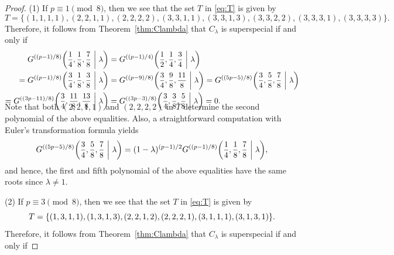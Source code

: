 \documentclass[10pt,a4paper]{amsart}
\begin{document}
\begin{proof}
(1) If $p \equiv 1 \pmod{8}$, then we see that the set $T$ in \eqref{eq:T} is given by\vspace{-1mm}
\[
    T = \{(1,1,1,1),(2,2,1,1),(2,2,2,2),(3,3,1,1),(3,3,1,3),(3,3,2,2),(3,3,3,1),(3,3,3,3)\}.
\]
Therefore, it follows from Theorem~\ref{thm:Clambda} that $C_\lambda$ is superspecial if and only if\vspace{-1.1mm}
\begin{align*}
    G^{((p-1)/8)}\scalebox{0.95}{$\displaystyle\left(\frac{1}{4},\frac{1}{8},\frac{7}{8}\ \middle|\ \lambda\right)$} &= G^{((p-1)/4)}\scalebox{0.95}{$\displaystyle\left(\frac{1}{2},\frac{1}{4},\frac{3}{4}\ \middle|\ \lambda\right)$}\\[-0.2mm]
    = G^{((p-1)/8)}\scalebox{0.95}{$\displaystyle\left(\frac{3}{4},\frac{1}{8},\frac{3}{8}\ \middle|\ \lambda\right)$} &= G^{((p-9)/8)}\scalebox{0.95}{$\displaystyle\left(\frac{3}{4},\frac{9}{8},\frac{11}{8}\ \middle|\ \lambda\right)$} = G^{((5p-5)/8)}\scalebox{0.95}{$\displaystyle\left(\frac{3}{4},\frac{5}{8},\frac{7}{8}\ \middle|\ \lambda\right)$}\\[-0.2mm]
    = G^{((3p-11)/8)}\scalebox{0.95}{$\displaystyle\left(\frac{3}{4},\frac{11}{8},\frac{13}{8}\ \middle|\ \lambda\right)$} &= G^{((3p-3)/8)}\scalebox{0.95}{$\displaystyle\left(\frac{3}{4},\frac{3}{8},\frac{5}{8}\ \middle|\ \lambda\right)$} = 0.\\[-6.5mm]
\end{align*}
Note that both $(2,2,1,1)$ and $(2,2,2,2)$ in $T$ determine the second polynomial of the above equalities.
Also, a straightforward computation with Euler’s transformation formula yields\vspace{-1.3mm}
\[
    G^{((5p-5)/8)}\scalebox{0.95}{$\displaystyle\left(\frac{3}{4},\frac{5}{8},\frac{7}{8}\ \middle|\ \lambda\right)$} = (1-\lambda)^{(p-1)/2}G^{((p-1)/8)}\scalebox{0.95}{$\displaystyle\left(\frac{1}{4},\frac{1}{8},\frac{7}{8}\ \middle|\ \lambda\right)$},\vspace{-1.1mm}
\]
and hence, the first and fifth polynomial of the above equalities have the same roots since $\lambda \neq 1$.\par
\hspace{5.8mm}(2) If $p \equiv 3 \pmod{8}$, then we see that the set $T$ in \eqref{eq:T} is given by\vspace{-1.2mm}
\[
    T = \{(1,3,1,1),(1,3,1,3),(2,2,1,2),(2,2,2,1),(3,1,1,1),(3,1,3,1)\}.\vspace{-0.1mm}
\]
Therefore, it follows from Theorem~\ref{thm:Clambda} that $C_\lambda$ is superspecial if and only if\vspace{-1.1mm}

\end{proof}
\end{document}
